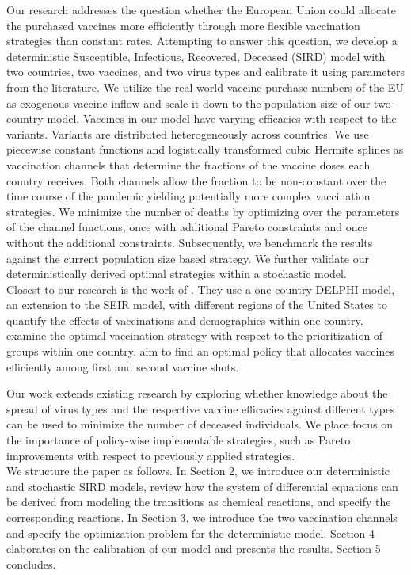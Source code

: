 Our research addresses the question whether the European Union could allocate the purchased vaccines more efficiently through more flexible vaccination strategies than constant rates. Attempting to answer this question, we develop a deterministic Susceptible, Infectious, Recovered, Deceased (SIRD) model with two countries, two vaccines, and two virus types and calibrate it using parameters from the literature. We utilize the real-world vaccine purchase numbers of the EU as exogenous vaccine inflow and scale it down to the population size of our two-country model. Vaccines in our model have varying efficacies with respect to the variants. Variants are distributed heterogeneously across countries. We use piecewise constant functions and logistically transformed cubic Hermite splines as vaccination channels that determine the fractions of the vaccine doses each country receives. Both channels allow the fraction to be non-constant over the time course of the pandemic yielding potentially more complex vaccination strategies. We minimize the number of deaths by optimizing over the parameters of the channel functions, once with additional Pareto constraints and once without the additional constraints. Subsequently, we benchmark the results against the current population size based strategy. We further validate our deterministically derived optimal strategies within a stochastic model.\\


Closest to our research is the work of \cite{Bertsimas.2020}. They use a one-country DELPHI model, an extension to the SEIR model, with different regions of the United States to quantify the effects of vaccinations and demographics within one country. \cite{Matrajt.2021} examine the optimal vaccination strategy with respect to the prioritization of groups within one country. \cite{Tuite.2021} aim to find an optimal policy that allocates vaccines efficiently among first and second vaccine shots.


Our work extends existing research by exploring whether knowledge about the spread of virus types and the respective vaccine efficacies against different types can be used to minimize the number of deceased individuals. We place focus on the importance of policy-wise implementable strategies, such as Pareto improvements with respect to previously applied strategies. \\

We structure the paper as follows. In Section 2, we introduce our deterministic and stochastic SIRD models, review how the system of differential equations can be derived from modeling the transitions as chemical reactions, and specify the corresponding reactions. In Section 3, we introduce the two vaccination channels and specify the optimization problem for the deterministic model. Section 4 elaborates on the calibration of our model and presents the results. Section 5 concludes. 


